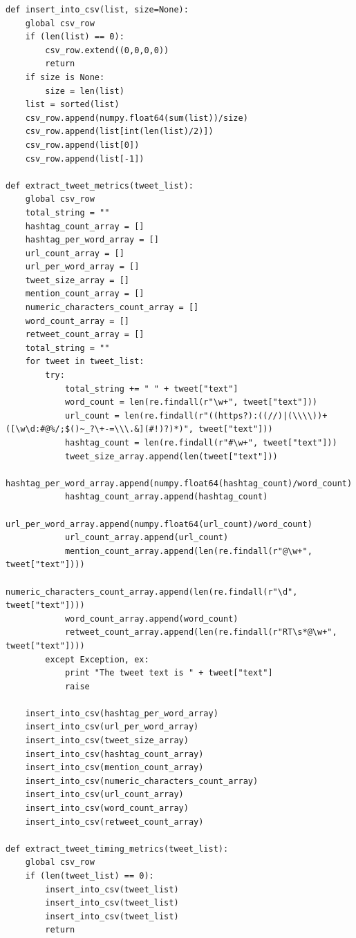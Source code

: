 \documentclass[11pt]{article}
\begin{document}
\begin{lstlisting}
def insert_into_csv(list, size=None):
    global csv_row
    if (len(list) == 0):
        csv_row.extend((0,0,0,0))
        return    
    if size is None:
        size = len(list)
    list = sorted(list)
    csv_row.append(numpy.float64(sum(list))/size)
    csv_row.append(list[int(len(list)/2)])
    csv_row.append(list[0])
    csv_row.append(list[-1])

def extract_tweet_metrics(tweet_list):
    global csv_row
    total_string = ""
    hashtag_count_array = []
    hashtag_per_word_array = []
    url_count_array = []
    url_per_word_array = []
    tweet_size_array = []
    mention_count_array = []
    numeric_characters_count_array = []
    word_count_array = []
    retweet_count_array = []
    total_string = ""
    for tweet in tweet_list:
        try:
            total_string += " " + tweet["text"]
            word_count = len(re.findall(r"\w+", tweet["text"]))
            url_count = len(re.findall(r"((https?):((//)|(\\\\))+([\w\d:#@%/;$()~_?\+-=\\\.&](#!)?)*)", tweet["text"]))
            hashtag_count = len(re.findall(r"#\w+", tweet["text"]))
            tweet_size_array.append(len(tweet["text"]))
            hashtag_per_word_array.append(numpy.float64(hashtag_count)/word_count)
            hashtag_count_array.append(hashtag_count)
            url_per_word_array.append(numpy.float64(url_count)/word_count)
            url_count_array.append(url_count)
            mention_count_array.append(len(re.findall(r"@\w+", tweet["text"])))
            numeric_characters_count_array.append(len(re.findall(r"\d", tweet["text"])))
            word_count_array.append(word_count)
            retweet_count_array.append(len(re.findall(r"RT\s*@\w+", tweet["text"])))
        except Exception, ex:
            print "The tweet text is " + tweet["text"]
            raise

    insert_into_csv(hashtag_per_word_array)
    insert_into_csv(url_per_word_array)
    insert_into_csv(tweet_size_array)
    insert_into_csv(hashtag_count_array)
    insert_into_csv(mention_count_array)
    insert_into_csv(numeric_characters_count_array)
    insert_into_csv(url_count_array)
    insert_into_csv(word_count_array)
    insert_into_csv(retweet_count_array)    

def extract_tweet_timing_metrics(tweet_list):
    global csv_row
    if (len(tweet_list) == 0):
        insert_into_csv(tweet_list)
        insert_into_csv(tweet_list)
        insert_into_csv(tweet_list)
        return


\end{lstlisting}
\end{document}
